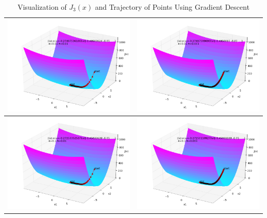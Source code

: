 \begin{itemize}
\begin{table}[ht]
\centering
\begin{tabular}{|c|c|}
\hline
\includegraphics[width=8cm]{J3_1.png}&\includegraphics[width=8cm]{J3_2.png}\\
\hline
\includegraphics[width=8cm]{J3_3.png}&\includegraphics[width=8cm]{J3_4.png}\\
\hline
\end{tabular}
\caption{Visualization of $J_3(x)$ and Trajectory of Points Using Gradient Descent}
\label{J3}
\end{table}


\end{itemize}
